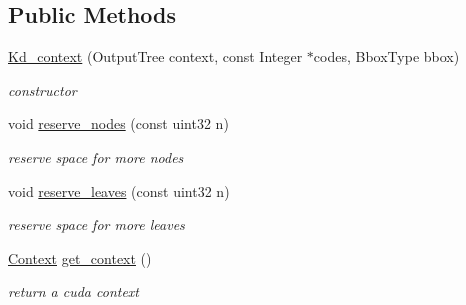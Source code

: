 \subsection*{Public Methods}
\begin{DoxyCompactItemize}
\item 
\mbox{\label{structcugar_1_1cuda_1_1kd_1_1_kd__context_a00ec8a71f810a654a1c513c460785eb6}} 
\hyperlink{structcugar_1_1cuda_1_1kd_1_1_kd__context_a00ec8a71f810a654a1c513c460785eb6}{Kd\+\_\+context} (Output\+Tree context, const Integer $\ast$codes, Bbox\+Type bbox)
\begin{DoxyCompactList}\small\item\em constructor \end{DoxyCompactList}\item 
\mbox{\label{structcugar_1_1cuda_1_1kd_1_1_kd__context_aa51f244c19bc1c91b93171d1382abb6b}} 
void \hyperlink{structcugar_1_1cuda_1_1kd_1_1_kd__context_aa51f244c19bc1c91b93171d1382abb6b}{reserve\+\_\+nodes} (const uint32 n)
\begin{DoxyCompactList}\small\item\em reserve space for more nodes \end{DoxyCompactList}\item 
\mbox{\label{structcugar_1_1cuda_1_1kd_1_1_kd__context_a4d8c3e0a23c2bb7f4fb9e184e453b920}} 
void \hyperlink{structcugar_1_1cuda_1_1kd_1_1_kd__context_a4d8c3e0a23c2bb7f4fb9e184e453b920}{reserve\+\_\+leaves} (const uint32 n)
\begin{DoxyCompactList}\small\item\em reserve space for more leaves \end{DoxyCompactList}\item 
\mbox{\label{structcugar_1_1cuda_1_1kd_1_1_kd__context_a1236e56d6d83701f3e5666148799e500}} 
\hyperlink{structcugar_1_1cuda_1_1kd_1_1_kd__context_1_1_context}{Context} \hyperlink{structcugar_1_1cuda_1_1kd_1_1_kd__context_a1236e56d6d83701f3e5666148799e500}{get\+\_\+context} ()
\begin{DoxyCompactList}\small\item\em return a cuda context \end{DoxyCompactList}\end{DoxyCompactItemize}
